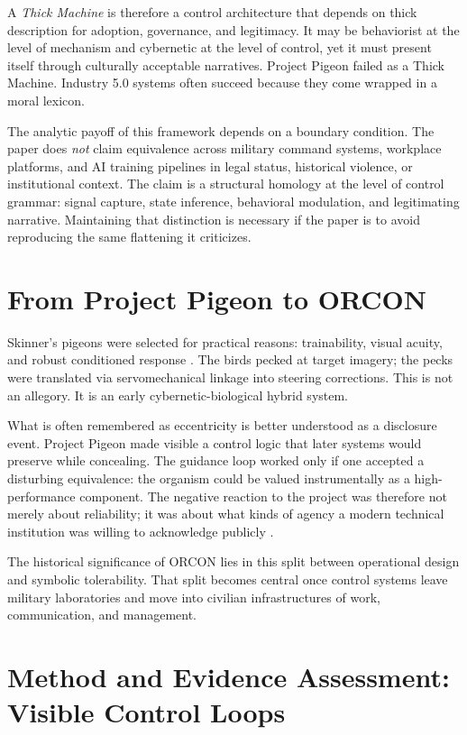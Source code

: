 \documentclass[runningheads]{llncs}
\begin{document}
A \emph{Thick Machine} is therefore a control architecture that depends on thick description for adoption, governance, and legitimacy. It may be behaviorist at the level of mechanism and cybernetic at the level of control, yet it must present itself through culturally acceptable narratives. Project Pigeon failed as a Thick Machine. Industry 5.0 systems often succeed because they come wrapped in a moral lexicon.

The analytic payoff of this framework depends on a boundary condition. The paper does \emph{not} claim equivalence across military command systems, workplace platforms, and AI training pipelines in legal status, historical violence, or institutional context. The claim is a structural homology at the level of control grammar: signal capture, state inference, behavioral modulation, and legitimating narrative. Maintaining that distinction is necessary if the paper is to avoid reproducing the same flattening it criticizes.

\section{From Project Pigeon to ORCON}

Skinner's pigeons were selected for practical reasons: trainability, visual acuity, and robust conditioned response \cite{skinner1960pigeons}. The birds pecked at target imagery; the pecks were translated via servomechanical linkage into steering corrections. This is not an allegory. It is an early cybernetic-biological hybrid system.

What is often remembered as eccentricity is better understood as a disclosure event. Project Pigeon made visible a control logic that later systems would preserve while concealing. The guidance loop worked only if one accepted a disturbing equivalence: the organism could be valued instrumentally as a high-performance component. The negative reaction to the project was therefore not merely about reliability; it was about what kinds of agency a modern technical institution was willing to acknowledge publicly \cite{capshew1993engineering,schultzfigueroa2019project,wlodarczyk2020beyond}.

The historical significance of ORCON lies in this split between operational design and symbolic tolerability. That split becomes central once control systems leave military laboratories and move into civilian infrastructures of work, communication, and management.

\section{Method and Evidence Assessment: Visible Control Loops}
\end{document}

